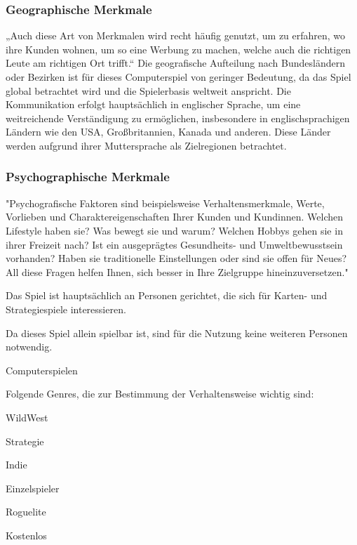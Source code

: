 \subsubsection{Geographische Merkmale}\label{subsubsec:Geographische-Merkmale}

„Auch diese Art von Merkmalen wird recht häufig genutzt, um zu erfahren, wo ihre Kunden wohnen, um so eine Werbung zu machen, welche auch die richtigen Leute am richtigen Ort trifft.“
Die geografische Aufteilung nach Bundesländern oder Bezirken ist für dieses Computerspiel von geringer Bedeutung, da das Spiel global betrachtet wird und die Spielerbasis weltweit anspricht.
Die Kommunikation erfolgt hauptsächlich in englischer Sprache, um eine weitreichende Verständigung zu ermöglichen, insbesondere in englischsprachigen Ländern wie den USA, Großbritannien, Kanada und anderen.
Diese Länder werden aufgrund ihrer Muttersprache als Zielregionen betrachtet.

\subsubsection{Psychographische Merkmale}\label{subsubsec:Psychographische-Merkmale}

"Psychografische Faktoren sind beispielsweise Verhaltensmerkmale, Werte, Vorlieben und Charaktereigenschaften Ihrer Kunden und Kundinnen.
Welchen Lifestyle haben sie?
Was bewegt sie und warum?
Welchen Hobbys gehen sie in ihrer Freizeit nach?
Ist ein ausgeprägtes Gesundheits- und Umweltbewusstsein vorhanden?
Haben sie traditionelle Einstellungen oder
sind sie offen für Neues?
All diese Fragen helfen Ihnen, sich besser in Ihre Zielgruppe hineinzuversetzen." 

 Das Spiel ist hauptsächlich an Personen gerichtet, die sich für Karten- und Strategiespiele interessieren.

 Da dieses Spiel allein spielbar ist, sind für die Nutzung keine weiteren Personen notwendig.

 Computerspielen

Folgende Genres, die zur Bestimmung der Verhaltensweise wichtig sind:
\begin{liste}
    \item WildWest
    \item Strategie
    \item Indie
    \item Einzelspieler
    \item Roguelite
    \item Kostenlos
\end{liste}


